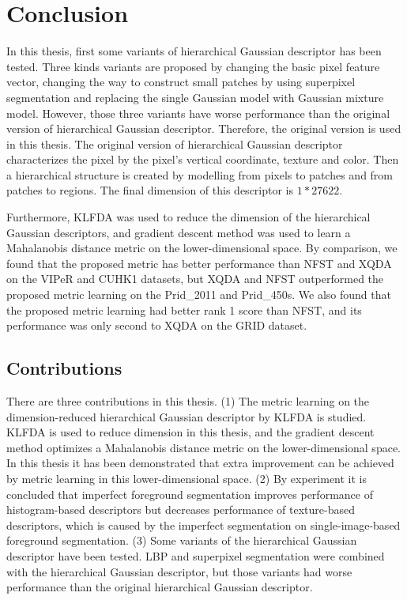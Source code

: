 
\chapter{Conclusion} %

In this thesis, first some variants of hierarchical Gaussian descriptor has been tested. Three kinds variants are proposed by changing the basic pixel feature vector, changing the way to construct small patches by using superpixel segmentation and replacing the single Gaussian model with Gaussian mixture model. However, those three variants have worse performance than the original version of hierarchical Gaussian descriptor. Therefore, the original version is used in this thesis. The original version of hierarchical Gaussian descriptor characterizes the pixel by the pixel's vertical coordinate, texture and color. Then a hierarchical structure is created by modelling from pixels to patches and from patches to regions. The final dimension of this descriptor is $1* 27622$.

Furthermore, KLFDA was used to reduce the dimension of the hierarchical Gaussian descriptors, and gradient descent method was used to learn a Mahalanobis distance metric on the lower-dimensional space. By comparison, we found that the proposed metric has better performance than NFST and XQDA on the VIPeR and CUHK1 datasets, but XQDA and NFST outperformed the proposed metric learning on the Prid\_2011 and Prid\_450s. We also found that the proposed metric learning had better rank 1 score than NFST, and its performance was only second to XQDA on the GRID dataset. 


\section{Contributions}
There are three contributions in this thesis. (1) The metric learning on the dimension-reduced hierarchical Gaussian descriptor by KLFDA is studied. KLFDA is used to reduce dimension in this thesis, and the gradient descent method optimizes a Mahalanobis distance metric on the lower-dimensional space. In this thesis it has been demonstrated that extra improvement can be achieved by metric learning in this lower-dimensional space. (2) By experiment it is concluded that imperfect foreground segmentation improves performance of histogram-based descriptors but decreases performance of texture-based descriptors, which is caused by the imperfect segmentation on single-image-based foreground segmentation. (3) Some variants of the hierarchical Gaussian descriptor have been tested. LBP and superpixel segmentation were combined with the hierarchical Gaussian descriptor, but those variants had worse performance than the original hierarchical Gaussian descriptor.

